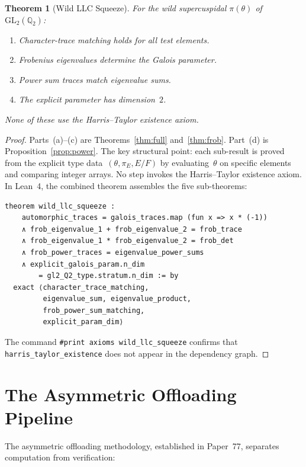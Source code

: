 \documentclass[11pt]{article}
\theoremstyle{plain}
\newtheorem{theorem}{Theorem}[section]
\theoremstyle{definition}
\theoremstyle{remark}
\newcommand{\Q}{\mathbb{Q}}
\newcommand{\GL}{\mathrm{GL}}
\begin{document}
\begin{theorem}[Wild LLC Squeeze]\label{thm:squeeze}
For the wild supercuspidal $\pi(\theta)$ of~$\GL_2(\Q_2)$:
\begin{enumerate}[nosep,label=(\alph*)]
\item Character-trace matching holds for all test elements.
\item Frobenius eigenvalues determine the Galois parameter.
\item Power sum traces match eigenvalue sums.
\item The explicit parameter has dimension~$2$.
\end{enumerate}
None of these use the Harris--Taylor existence axiom.
\end{theorem}
\begin{proof}
Parts~(a)--(c) are Theorems~\ref{thm:full} and~\ref{thm:frob}.
Part~(d) is Proposition~\ref{prop:power}.  The key structural
point: each sub-result is proved from the explicit type
data~$(\theta, \pi_E, E/F)$ by evaluating~$\theta$ on
specific elements and comparing integer arrays.  No step
invokes the Harris--Taylor existence axiom.  In Lean~4,
the combined theorem assembles the five sub-theorems:
\begin{lstlisting}
theorem wild_llc_squeeze :
    automorphic_traces = galois_traces.map (fun x => x * (-1))
    ∧ frob_eigenvalue_1 + frob_eigenvalue_2 = frob_trace
    ∧ frob_eigenvalue_1 * frob_eigenvalue_2 = frob_det
    ∧ frob_power_traces = eigenvalue_power_sums
    ∧ explicit_galois_param.n_dim
        = gl2_Q2_type.stratum.n_dim := by
  exact ⟨character_trace_matching,
         eigenvalue_sum, eigenvalue_product,
         frob_power_sum_matching,
         explicit_param_dim⟩
\end{lstlisting}
The command \texttt{\#print axioms wild\_llc\_squeeze} confirms
that \texttt{harris\_taylor\_existence} does not appear in the
dependency graph.
\end{proof}

\section{The Asymmetric Offloading Pipeline}\label{sec:pipeline}

The asymmetric offloading methodology, established in
Paper~77, separates computation from verification:
\end{document}
